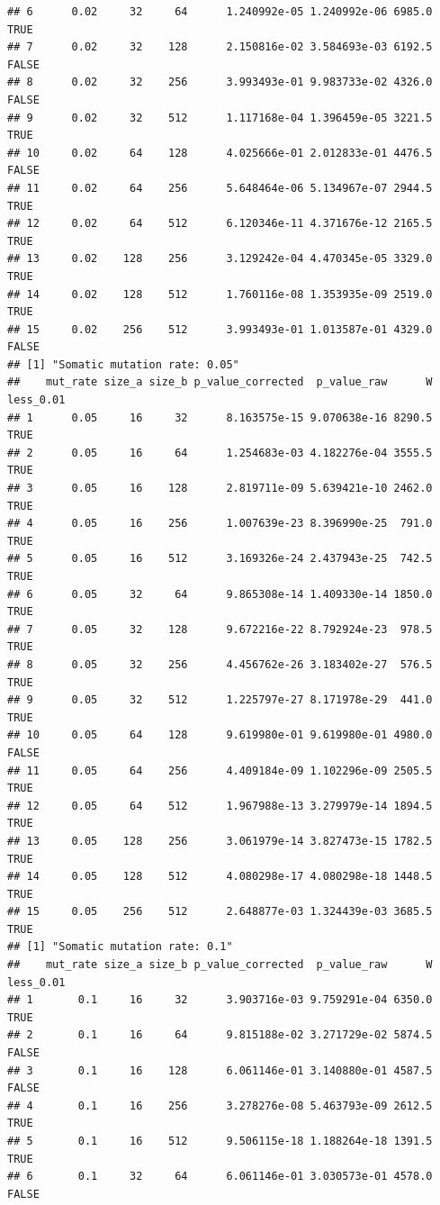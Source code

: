 \documentclass[]{book}
\begin{document}
\begin{verbatim}
## 6      0.02     32     64      1.240992e-05 1.240992e-06 6985.0      TRUE
## 7      0.02     32    128      2.150816e-02 3.584693e-03 6192.5     FALSE
## 8      0.02     32    256      3.993493e-01 9.983733e-02 4326.0     FALSE
## 9      0.02     32    512      1.117168e-04 1.396459e-05 3221.5      TRUE
## 10     0.02     64    128      4.025666e-01 2.012833e-01 4476.5     FALSE
## 11     0.02     64    256      5.648464e-06 5.134967e-07 2944.5      TRUE
## 12     0.02     64    512      6.120346e-11 4.371676e-12 2165.5      TRUE
## 13     0.02    128    256      3.129242e-04 4.470345e-05 3329.0      TRUE
## 14     0.02    128    512      1.760116e-08 1.353935e-09 2519.0      TRUE
## 15     0.02    256    512      3.993493e-01 1.013587e-01 4329.0     FALSE
## [1] "Somatic mutation rate: 0.05"
##    mut_rate size_a size_b p_value_corrected  p_value_raw      W less_0.01
## 1      0.05     16     32      8.163575e-15 9.070638e-16 8290.5      TRUE
## 2      0.05     16     64      1.254683e-03 4.182276e-04 3555.5      TRUE
## 3      0.05     16    128      2.819711e-09 5.639421e-10 2462.0      TRUE
## 4      0.05     16    256      1.007639e-23 8.396990e-25  791.0      TRUE
## 5      0.05     16    512      3.169326e-24 2.437943e-25  742.5      TRUE
## 6      0.05     32     64      9.865308e-14 1.409330e-14 1850.0      TRUE
## 7      0.05     32    128      9.672216e-22 8.792924e-23  978.5      TRUE
## 8      0.05     32    256      4.456762e-26 3.183402e-27  576.5      TRUE
## 9      0.05     32    512      1.225797e-27 8.171978e-29  441.0      TRUE
## 10     0.05     64    128      9.619980e-01 9.619980e-01 4980.0     FALSE
## 11     0.05     64    256      4.409184e-09 1.102296e-09 2505.5      TRUE
## 12     0.05     64    512      1.967988e-13 3.279979e-14 1894.5      TRUE
## 13     0.05    128    256      3.061979e-14 3.827473e-15 1782.5      TRUE
## 14     0.05    128    512      4.080298e-17 4.080298e-18 1448.5      TRUE
## 15     0.05    256    512      2.648877e-03 1.324439e-03 3685.5      TRUE
## [1] "Somatic mutation rate: 0.1"
##    mut_rate size_a size_b p_value_corrected  p_value_raw      W less_0.01
## 1       0.1     16     32      3.903716e-03 9.759291e-04 6350.0      TRUE
## 2       0.1     16     64      9.815188e-02 3.271729e-02 5874.5     FALSE
## 3       0.1     16    128      6.061146e-01 3.140880e-01 4587.5     FALSE
## 4       0.1     16    256      3.278276e-08 5.463793e-09 2612.5      TRUE
## 5       0.1     16    512      9.506115e-18 1.188264e-18 1391.5      TRUE
## 6       0.1     32     64      6.061146e-01 3.030573e-01 4578.0     FALSE

\end{verbatim}
\end{document}
